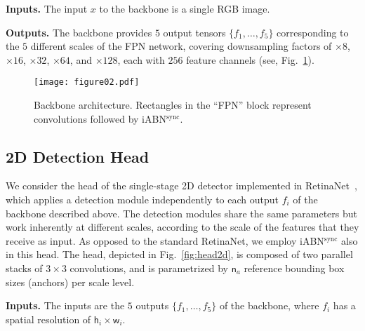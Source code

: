 \documentclass[10pt,twocolumn,letterpaper]{article}
\newcommand{\con}[1]{\ensuremath{\mathsf{#1}}}
\newcommand{\iABNsync}{iABN$^\text{sync}$\xspace}
\renewcommand{\paragraph}[1]{

        \vspace{3pt}
	\noindent\textbf{#1}}
\begin{document}
\paragraph{Inputs.}
The input $x$ to the backbone is a single RGB image.

\paragraph{Outputs.}
The backbone provides $5$ output tensors $\{f_1, \ldots, f_5\}$ corresponding to the $5$ different scales of the FPN network, covering downsampling factors of $\times 8$, $\times 16$, $\times 32$, $\times 64$, and $\times 128$, each with $256$ feature channels (see, Fig.~\ref{fig:backbone}).


\begin{figure}[th]
    \centering
    \texttt{[image: figure02.pdf]}
    \caption{Backbone architecture. Rectangles in the ``FPN'' block represent convolutions followed by \iABNsync.}
    \label{fig:backbone}
    \vspace{-12pt}
\end{figure}

\subsection{2D Detection Head}
\label{sec:head2D}
We consider the head of the single-stage 2D detector implemented in RetinaNet~\cite{Lin+17}, which applies a detection module independently to each output $f_i$ of the backbone described above. The detection modules share the same parameters but work inherently at different scales, according to the scale of the features that they receive as input. As opposed to the standard RetinaNet, we employ \iABNsync also in this head.
The head, depicted in Fig.~\ref{fig:head2d}, is composed of two parallel stacks of $3\times 3$ convolutions, and is parametrized by $\con n_a$ reference bounding box sizes (anchors) per scale level.

\paragraph{Inputs.}
The inputs are the $5$ outputs $\{f_1, \ldots, f_5\}$ of the backbone, where $f_i$ has a spatial resolution of $\con h_i\times \con w_i$.
\end{document}
